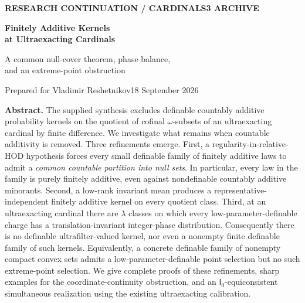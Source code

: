 \documentclass[11pt,letterpaper]{article}
\theoremstyle{definition}
\newcommand{\Izero}{\mathsf I_0}
\begin{document}
\thispagestyle{empty}
{\sffamily\small\bfseries\color{Olive}RESEARCH CONTINUATION \quad / \quad CARDINALS3 ARCHIVE\par}
\vspace{15pt}
{\fontsize{28}{31}\selectfont\bfseries\color{Forest}Finitely Additive Kernels\\at Ultraexacting Cardinals\par}
\vspace{10pt}
{\fontsize{14}{18}\selectfont\color{Forest}A common null-cover theorem, phase balance,\\and an extreme-point obstruction\par}
\vspace{12pt}
{\color{Muted}Prepared for Vladimir Reshetnikov\hfill 18 September 2026\par}
\vspace{12pt}

\textbf{Abstract.}
The supplied synthesis excludes definable countably additive probability kernels on the quotient of cofinal $\omega$-subsets of an ultraexacting cardinal by finite difference. We investigate what remains when countable additivity is removed. Three refinements emerge. First, a regularity-in-relative-HOD hypothesis forces every small definable family of finitely additive laws to admit a \emph{common countable partition into null sets}. In particular, every law in the family is purely finitely additive, even against nondefinable countably additive minorants. Second, a low-rank invariant mean produces a representative-independent finitely additive kernel on every quotient class. Third, at an ultraexacting cardinal there are $\lambda$ classes on which every low-parameter-definable charge has a translation-invariant integer-phase distribution. Consequently there is no definable ultrafilter-valued kernel, nor even a nonempty finite definable family of such kernels. Equivalently, a concrete definable family of nonempty compact convex sets admits a low-parameter-definable point selection but no such extreme-point selection. We give complete proofs of these refinements, sharp examples for the coordinate-continuity obstruction, and an $\Izero$-equiconsistent simultaneous realization using the existing ultraexacting calibration.
\end{document}
